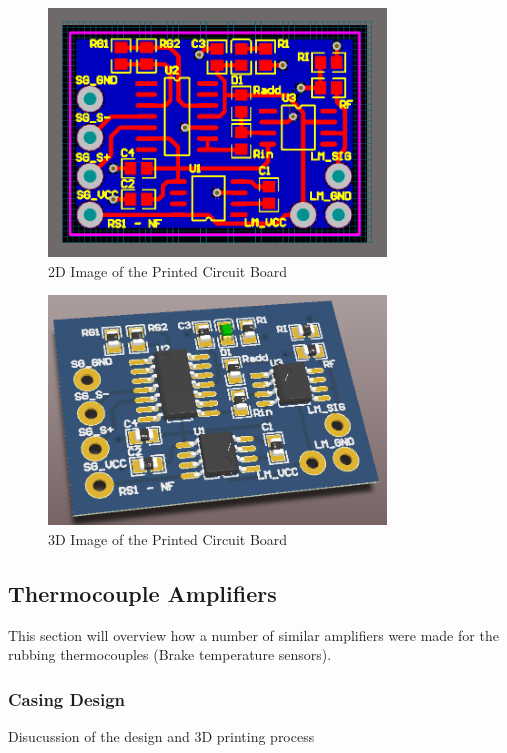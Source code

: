 \begin{figure}[h!]
	\centering
	\includegraphics[width=0.8\textwidth]{Images/Strain_Gauges/IMG_SG_Amp2DPCB.png}
	\caption{2D Image of the Printed Circuit Board}
	\label{fig:IMG_SG_Amp2DPCB}
\end{figure}

\begin{figure}[h!]
	\centering
	\includegraphics[width=0.8\textwidth]{Images/Strain_Gauges/IMG_SG_Amp3DPCB.png}
	\caption{3D Image of the Printed Circuit Board}
	\label{fig:IMG_SG_Amp3DPCB}
\end{figure}

\subsection{Thermocouple Amplifiers}
This section will overview how a number of similar amplifiers were made for the rubbing thermocouples (Brake temperature sensors).

\subsubsection{Casing Design}
Disucussion of the design and 3D printing process 

